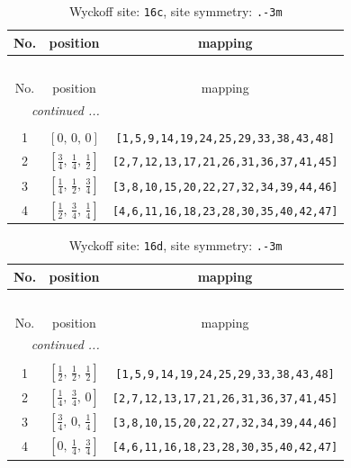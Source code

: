 \documentclass[fleqn,8pt]{jsarticle}
\begin{document}
\renewcommand{\arraystretch}{1.2}
\begin{longtable}{ccc}
\caption{Wyckoff site: {\tt 16c}, site symmetry: {\tt .-3m}}
 \\
 \hline \hline
No. & position & mapping \\ \hline \endfirsthead

\multicolumn{2}{l}{\tablename\ \thetable{}} \\
 \hline \hline
No. & position & mapping \\ \hline \endhead

 \hline \hline
\multicolumn{2}{r}{\footnotesize\it continued ...} \\ \endfoot

 \hline \hline
\multicolumn{2}{r}{} \\ \endlastfoot

1 & $\left[ 0,\, 0,\, 0 \right]$ & {\tt [1,5,9,14,19,24,25,29,33,38,43,48]} \\ \hline
2 & $\left[ \frac{3}{4},\, \frac{1}{4},\, \frac{1}{2} \right]$ & {\tt [2,7,12,13,17,21,26,31,36,37,41,45]} \\ \hline
3 & $\left[ \frac{1}{4},\, \frac{1}{2},\, \frac{3}{4} \right]$ & {\tt [3,8,10,15,20,22,27,32,34,39,44,46]} \\ \hline
4 & $\left[ \frac{1}{2},\, \frac{3}{4},\, \frac{1}{4} \right]$ & {\tt [4,6,11,16,18,23,28,30,35,40,42,47]} \\
\end{longtable}
\renewcommand{\arraystretch}{1.2}
\begin{longtable}{ccc}
\caption{Wyckoff site: {\tt 16d}, site symmetry: {\tt .-3m}}
 \\
 \hline \hline
No. & position & mapping \\ \hline \endfirsthead

\multicolumn{2}{l}{\tablename\ \thetable{}} \\
 \hline \hline
No. & position & mapping \\ \hline \endhead

 \hline \hline
\multicolumn{2}{r}{\footnotesize\it continued ...} \\ \endfoot

 \hline \hline
\multicolumn{2}{r}{} \\ \endlastfoot

1 & $\left[ \frac{1}{2},\, \frac{1}{2},\, \frac{1}{2} \right]$ & {\tt [1,5,9,14,19,24,25,29,33,38,43,48]} \\ \hline
2 & $\left[ \frac{1}{4},\, \frac{3}{4},\, 0 \right]$ & {\tt [2,7,12,13,17,21,26,31,36,37,41,45]} \\ \hline
3 & $\left[ \frac{3}{4},\, 0,\, \frac{1}{4} \right]$ & {\tt [3,8,10,15,20,22,27,32,34,39,44,46]} \\ \hline
4 & $\left[ 0,\, \frac{1}{4},\, \frac{3}{4} \right]$ & {\tt [4,6,11,16,18,23,28,30,35,40,42,47]} \\
\end{longtable}
\end{document}
